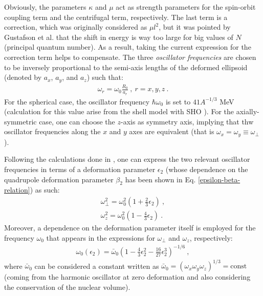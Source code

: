Obviously, the parameters $\kappa$ and $\mu$ act as strength parameters for the spin-orbit coupling term and the centrifugal term, respectively. The last term is a correction, which was originally considered as $\mu l^2$, but it was pointed by Gustafson et al. \cite{gustafson1967nuclear} that the shift in energy is way too large for big values of $N$ (principal quantum number). As a result, taking the current expression for the correction term helps to compensate. The three \emph{oscillator frequencies} are chosen to be inversely proportional to the semi-axis lengths of the deformed ellipsoid (denoted by $a_x$, $a_y$, and $a_z$) such that:
\begin{align}
    \omega_r=\omega_0\frac{R_0}{a_r}\ ,\ r=x,y,z\ .
\end{align}
For the spherical case, the oscillator frequency $\hbar\omega_0$ is set to $41A^{-1/3}$ MeV (calculation for this value arise from the shell model with SHO \cite{bertulani2007nuclear}). For the axially-symmetric case, one can choose the $z$-axis as symmetry axis, implying that thw oscillator frequencies along the $x$ and $y$ axes are equivalent (that is $\omega_x=\omega_y\equiv\omega_\perp$).

Following the calculations done in \cite{bertulani2007nuclear}, one can express the two relevant oscillator frequencies in terms of a deformation parameter $\epsilon_2$ (whose dependence on the quadrupole deformation parameter $\beta_2$ has been shown in Eq. \ref{epsilon-beta-relation}) as such:
\begin{align}
    \omega_\perp^2=\omega_0^2\left(1+\frac{2}{3}\epsilon_2\right)\ ,\\
    \omega_z^2=\omega_0^2\left(1-\frac{4}{3}\epsilon_2\right)\ .
\end{align}
Moreover, a dependence on the deformation parameter itself is employed for the frequency $\omega_0$ that appears in the expressions for $\omega_\perp$ and $\omega_z$, respectively:
\begin{align}
    \omega_0(\epsilon_2)=\bar{\omega}_0\left(1-\frac{4}{3}\epsilon_2^2-\frac{16}{27}\epsilon_2^3\right)^{-1/6}\ ,
\end{align}
where $\bar{\omega}_0$ can be considered a constant written as $\bar{\omega}_0=(\omega_x\omega_y\omega_z)^{1/3}=\text{const}$ (coming from the harmonic oscillator at zero deformation and also considering the conservation of the nuclear volume).

